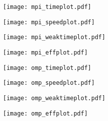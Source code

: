 \documentclass[xcolor=table]{beamer}
\begin{document}
\begin{frame}[label=strong-scaling-time]
\texttt{[image: mpi\_timeplot.pdf]}
\end{frame}

\begin{frame}[label=strong-scaling-speedup]
\texttt{[image: mpi\_speedplot.pdf]}
\end{frame}

\begin{frame}[label=weak-scaling-time]
\texttt{[image: mpi\_weaktimeplot.pdf]}
\end{frame}

\begin{frame}[label=weak-scaling-efficiency]
\texttt{[image: mpi\_effplot.pdf]}
\end{frame}

\begin{frame}[label=omp-strong-scaling-time]
\texttt{[image: omp\_timeplot.pdf]}
\end{frame}

\begin{frame}[label=omp-strong-scaling-speedup]
\texttt{[image: omp\_speedplot.pdf]}
\end{frame}

\begin{frame}[label=omp-weak-scaling-time]
\texttt{[image: omp\_weaktimeplot.pdf]}
\end{frame}

\begin{frame}[label=omp-weak-scaling-efficiency]
\texttt{[image: omp\_effplot.pdf]}
\end{frame}


        



\end{document}
